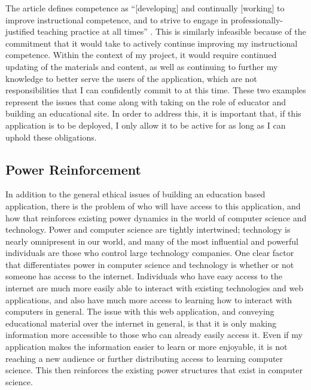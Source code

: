 \documentclass[10pt,twocolumn]{article}
\begin{document}
The article defines competence as “[developing] and continually [working] to improve instructional competence, and to 
strive to engage in professionally-justified teaching practice at all times” \cite{MichiganEducation}. This is 
similarly infeasible because of the commitment that it would take to actively continue improving my instructional 
competence. Within the context of my project, it would require continued updating of the materials and content, as well 
as continuing to further my knowledge to better serve the users of the application, which are not responsibilities that 
I can confidently commit to at this time. These two examples represent the issues that come along with taking on the 
role of educator and building an educational site. In order to address this, it is important that, if this application 
is to be deployed, I only allow it to be active for as long as I can uphold these obligations. 

\subsection{Power Reinforcement}

In addition to the general ethical issues of building an education based application, there is the problem of who will 
have access to this application, and how that reinforces existing power dynamics in the world of computer science and 
technology. Power and computer science are tightly intertwined; technology is nearly omnipresent in our world, and many 
of the most influential and powerful individuals are those who control large technology companies. One clear factor that 
differentiates power in computer science and technology is whether or not someone has 
access to the internet. Individuals who have easy access to the internet are much more easily able to interact with 
existing technologies and web applications, and also have much more access to learning how to interact with computers in 
general. The issue with this web application, and conveying educational material over the internet in general, is that 
it is only making information more accessible to those who can already easily access it. Even if my application makes 
the information easier to learn 
or more enjoyable, it is not reaching a new audience or further distributing access to learning computer science. This 
then reinforces the existing power structures that exist in computer science. 
\end{document}
